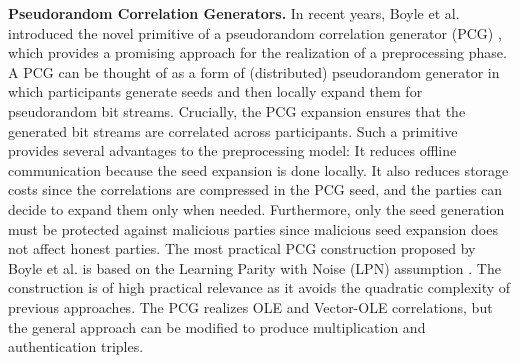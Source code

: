 \textbf{Pseudorandom Correlation Generators.} In recent years, Boyle et al. introduced the novel primitive of a pseudorandom correlation generator (PCG) \cite{boyle2019efficient, boyle2020efficient}, which provides a promising approach for the realization of a preprocessing phase. A PCG can be thought of as a form of (distributed) pseudorandom generator in which participants generate seeds and then locally expand them for pseudorandom bit streams. Crucially, the PCG expansion ensures that the generated bit streams are correlated across participants. Such a primitive provides several advantages to the preprocessing model: It reduces offline communication because the seed expansion is done locally. It also reduces storage costs since the correlations are compressed in the PCG seed, and the parties can decide to expand them only when needed. Furthermore, only the seed generation must be protected against malicious parties since malicious seed expansion does not affect honest parties. The most practical PCG construction proposed by Boyle et al. \cite{boyle2020efficient} is based on the Learning Parity with Noise (LPN) assumption \cite{pietrzak2012cryptography}. The construction is of high practical relevance as it avoids the quadratic complexity of previous approaches. The PCG realizes OLE and Vector-OLE correlations, but the general approach can be modified to produce multiplication and authentication triples.
\\\\

